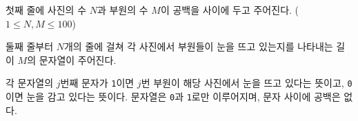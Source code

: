 첫째 줄에 사진의 수 $N$과 부원의 수 $M$이 공백을 사이에 두고 주어진다. ($1 \le N,M \le 100$)

둘째 줄부터 $N$개의 줄에 걸쳐 각 사진에서 부원들이 눈을 뜨고 있는지를 나타내는 길이 $M$의 문자열이 주어진다.

각 문자열의 $j$번째 문자가 \texttt{1}이면 $j$번 부원이 해당 사진에서 눈을 뜨고 있다는 뜻이고, \texttt{0}이면 눈을 감고 있다는 뜻이다. 문자열은 \texttt{0}과 \texttt{1}로만 이루어지며, 문자 사이에 공백은 없다.